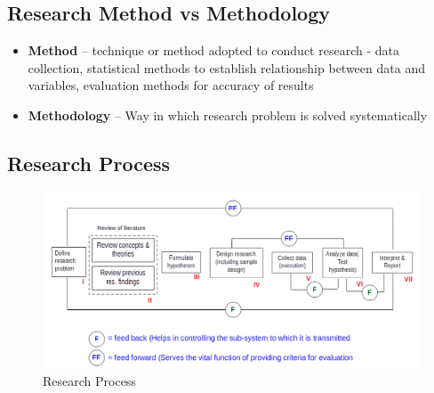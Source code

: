 \documentclass{article}
\begin{document}
\subsection{Research Method vs Methodology}

\begin{itemize}
    \item \textbf{Method} -- technique or method adopted to conduct research - data collection, statistical methods to establish relationship between data and variables, evaluation methods for accuracy of results
    \item \textbf{Methodology} -- Way in which research problem is solved systematically
\end{itemize}

\subsection{Research Process}

\begin{figure}[htp]
    \includegraphics[width=1 \linewidth]{img/flowchart.png}
    \caption{Research Process}
    \label{fig:flowchart}
\end{figure}
\end{document}
